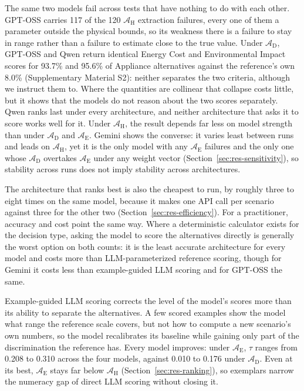 \documentclass[final,3p,times]{elsarticle}
\begin{document}
The same two models fail across tests that have nothing to do with each other. GPT-OSS carries 117 of the 120 $\mathcal{A}_{\text{H}}$ extraction failures, every one of them a parameter outside the physical bounds, so its weakness there is a failure to stay in range rather than a failure to estimate close to the true value. Under $\mathcal{A}_{\text{D}}$, GPT-OSS and Qwen return identical Energy Cost and Environmental Impact scores for 93.7\% and 95.6\% of Appliance alternatives against the reference's own 8.0\% (Supplementary Material S2): neither separates the two criteria, although we instruct them to. Where the quantities are collinear that collapse costs little, but it shows that the models do not reason about the two scores separately. Qwen ranks last under every architecture, and neither architecture that asks it to score works well for it. Under $\mathcal{A}_{\text{H}}$, the result depends far less on model strength than under $\mathcal{A}_{\text{D}}$ and $\mathcal{A}_{\text{E}}$. Gemini shows the converse: it varies least between runs and leads on $\mathcal{A}_{\text{H}}$, yet it is the only model with any $\mathcal{A}_{\text{E}}$ failures and the only one whose $\mathcal{A}_{\text{D}}$ overtakes $\mathcal{A}_{\text{E}}$ under any weight vector (Section~\ref{sec:res-sensitivity}), so stability across runs does not imply stability across architectures.

The architecture that ranks best is also the cheapest to run, by roughly three to eight times on the same model, because it makes one API call per scenario against three for the other two (Section~\ref{sec:res-efficiency}). For a practitioner, accuracy and cost point the same way. Where a deterministic calculator exists for the decision type, asking the model to score the alternatives directly is generally the worst option on both counts: it is the least accurate architecture for every model and costs more than LLM-parameterized reference scoring, though for Gemini it costs less than example-guided LLM scoring and for GPT-OSS the same.

Example-guided LLM scoring corrects the level of the model's scores more than its ability to separate the alternatives. A few scored examples show the model what range the reference scale covers, but not how to compute a new scenario's own numbers, so the model recalibrates its baseline while gaining only part of the discrimination the reference has. Every model improves: under $\mathcal{A}_{\text{E}}$, $\tau$ ranges from 0.208 to 0.310 across the four models, against 0.010 to 0.176 under $\mathcal{A}_{\text{D}}$. Even at its best, $\mathcal{A}_{\text{E}}$ stays far below $\mathcal{A}_{\text{H}}$ (Section~\ref{sec:res-ranking}), so exemplars narrow the numeracy gap of direct LLM scoring without closing it.
\end{document}
